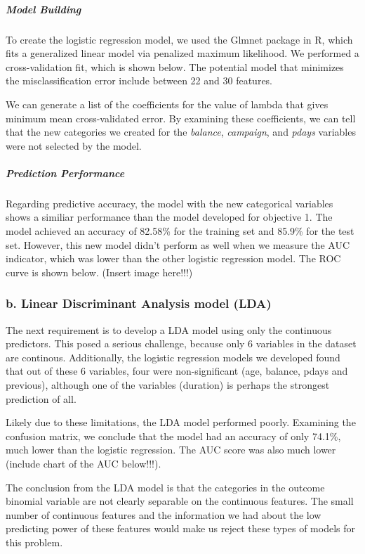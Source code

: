 \documentclass[]{article}
\let\oldsubparagraph\subparagraph
\renewcommand{\subparagraph}[1]{\oldsubparagraph{#1}\mbox{}}
\begin{document}
\subparagraph{Model Building}\label{model-building-1}

To create the logistic regression model, we used the Glmnet package in
R, which fits a generalized linear model via penalized maximum
likelihood. We performed a cross-validation fit, which is shown below.
The potential model that minimizes the misclassification error include
between 22 and 30 features.

We can generate a list of the coefficients for the value of lambda that
gives minimum mean cross-validated error. By examining these
coefficients, we can tell that the new categories we created for the
\emph{balance}, \emph{campaign}, and \emph{pdays} variables were not
selected by the model.

\subparagraph{Prediction Performance}\label{prediction-performance-1}

Regarding predictive accuracy, the model with the new categorical
variables shows a similiar performance than the model developed for
objective 1. The model achieved an accuracy of 82.58\% for the training
set and 85.9\% for the test set. However, this new model didn't perform
as well when we measure the AUC indicator, which was lower than the
other logistic regression model. The ROC curve is shown below. (Insert
image here!!!)

\subsubsection{b. Linear Discriminant Analysis model
(LDA)}\label{b.-linear-discriminant-analysis-model-lda}

The next requirement is to develop a LDA model using only the continuous
predictors. This posed a serious challenge, because only 6 variables in
the dataset are continous. Additionally, the logistic regression models
we developed found that out of these 6 variables, four were
non-significant (age, balance, pdays and previous), although one of the
variables (duration) is perhaps the strongest prediction of all.

Likely due to these limitations, the LDA model performed poorly.
Examining the confusion matrix, we conclude that the model had an
accuracy of only 74.1\%, much lower than the logistic regression. The
AUC score was also much lower (include chart of the AUC below!!!).

The conclusion from the LDA model is that the categories in the outcome
binomial variable are not clearly separable on the continuous features.
The small number of continuous features and the information we had about
the low predicting power of these features would make us reject these
types of models for this problem.
\end{document}
